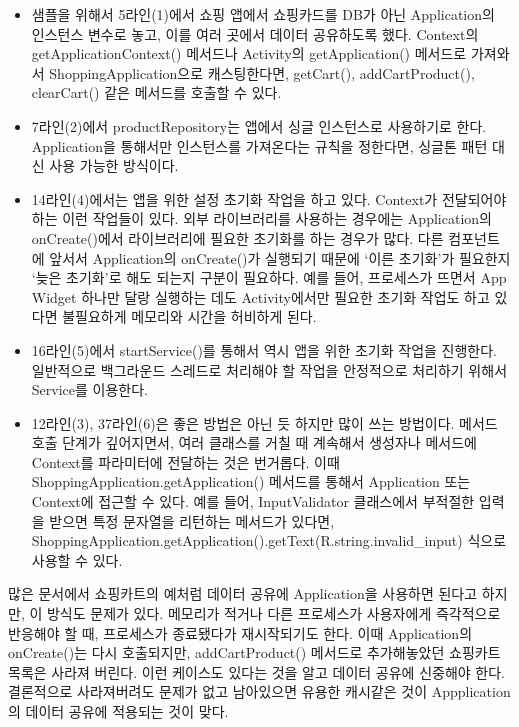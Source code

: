 \begin{itemize}
\item 샘플을 위해서 5라인(1)에서 쇼핑 앱에서 쇼핑카드를 DB가 아닌 Application의 인스턴스 변수로 놓고, 이를 여러 곳에서 데이터 공유하도록 했다.
Context의 getApplicationContext() 메서드나 Activity의 getApplication() 메서드로 가져와서 ShoppingApplication으로 캐스팅한다면, getCart(), addCartProduct(), clearCart() 같은 메서드를 호출할 수 있다.

\item 7라인(2)에서 productRepository는 앱에서 싱글 인스턴스로 사용하기로 한다. Application을 통해서만 인스턴스를 가져온다는 규칙을 정한다면, 싱글톤 패턴 대신 사용 가능한 방식이다.  

\item 14라인(4)에서는 앱을 위한 설정 초기화 작업을 하고 있다. Context가 전달되어야 하는 이런 작업들이 있다. 외부 라이브러리를 사용하는 경우에는 Application의 onCreate()에서 라이브러리에 필요한 초기화를 하는 경우가 많다. 
다른 컴포넌트에 앞서서 Application의 onCreate()가 실행되기 때문에 `이른 초기화'가 필요한지 `늦은 초기화'로 해도 되는지 구분이 필요하다.
예를 들어, 프로세스가 뜨면서 App Widget 하나만 달랑 실행하는 데도 Activity에서만 필요한 초기화 작업도 하고 있다면 불필요하게 메모리와 시간을 허비하게 된다.

\item 16라인(5)에서 startService()를 통해서 역시 앱을 위한 초기화 작업을 진행한다. 일반적으로 백그라운드 스레드로 처리해야 할 작업을 안정적으로 처리하기 위해서 Service를 이용한다.

\item 12라인(3), 37라인(6)은 좋은 방법은 아닌 듯 하지만 많이 쓰는 방법이다. 
메서드 호출 단계가 깊어지면서, 여러 클래스를 거칠 때 계속해서 생성자나 메서드에 Context를 파라미터에 전달하는 것은 번거롭다. 
이때 ShoppingApplication.getApplication() 메서드를 통해서 Application 또는 Context에 접근할 수 있다.
예를 들어, InputValidator 클래스에서 부적절한 입력을 받으면 특정 문자열을 리턴하는 메서드가 있다면,  ShoppingApplication.getApplication().getText(R.string.invalid\_input) 식으로 사용할 수 있다.
\end{itemize}

많은 문서에서 쇼핑카트의 예처럼 데이터 공유에 Application을 사용하면 된다고 하지만, 이 방식도 문제가 있다.
메모리가 적거나 다른 프로세스가 사용자에게 즉각적으로 반응해야 할 때, 프로세스가 종료됐다가 재시작되기도 한다.
이때 Application의 onCreate()는 다시 호출되지만, addCartProduct() 메서드로 추가해놓았던 쇼핑카트 목록은 사라져 버린다. 
이런 케이스도 있다는 것을 알고 데이터 공유에 신중해야 한다.
결론적으로 사라져버려도 문제가 없고 남아있으면 유용한 캐시같은 것이 Appplication의 데이터 공유에 적용되는 것이 맞다.

